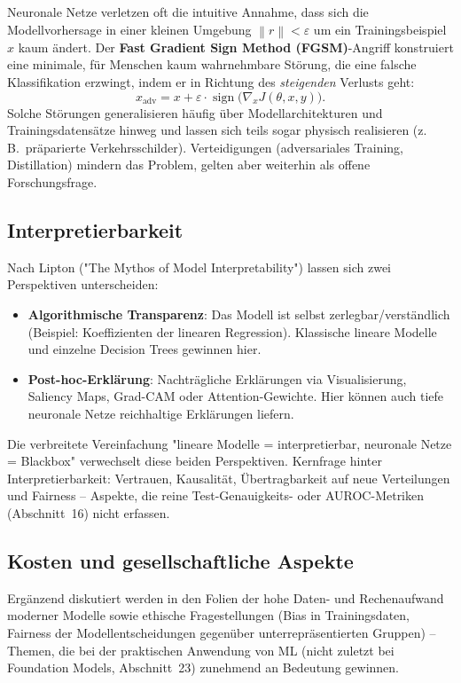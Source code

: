 \documentclass[11pt]{article}
\theoremstyle{csthm}
\theoremstyle{csdef}
\newcommand{\norm}[1]{\left\|#1\right\|}
\begin{document}
Neuronale Netze verletzen oft die intuitive Annahme, dass sich die
Modellvorhersage in einer kleinen Umgebung $\norm{r}<\varepsilon$ um ein
Trainingsbeispiel $x$ kaum ändert. Der \textbf{Fast Gradient Sign Method
(FGSM)}-Angriff konstruiert eine minimale, für Menschen kaum wahrnehmbare
Störung, die eine falsche Klassifikation erzwingt, indem er in Richtung des
\emph{steigenden} Verlusts geht:
\begin{equation}
  x_\text{adv} = x + \varepsilon\cdot\operatorname{sign}\bigl(\nabla_x J(\theta,x,y)\bigr).
\end{equation}
Solche Störungen generalisieren häufig über Modellarchitekturen und
Trainingsdatensätze hinweg und lassen sich teils sogar physisch realisieren
(z.\,B.\ präparierte Verkehrsschilder). Verteidigungen (adversariales
Training, Distillation) mindern das Problem, gelten aber weiterhin als
offene Forschungsfrage.

\subsection{Interpretierbarkeit}

Nach Lipton ("The Mythos of Model Interpretability") lassen sich zwei
Perspektiven unterscheiden:
\begin{itemize}
  \item \textbf{Algorithmische Transparenz}: Das Modell ist selbst
        zerlegbar/verständlich (Beispiel: Koeffizienten der linearen
        Regression). Klassische lineare Modelle und einzelne Decision Trees
        gewinnen hier.
  \item \textbf{Post-hoc-Erklärung}: Nachträgliche Erklärungen via
        Visualisierung, Saliency Maps, Grad-CAM oder Attention-Gewichte.
        Hier können auch tiefe neuronale Netze reichhaltige Erklärungen
        liefern.
\end{itemize}
Die verbreitete Vereinfachung "lineare Modelle = interpretierbar, neuronale
Netze = Blackbox" verwechselt diese beiden Perspektiven. Kernfrage hinter
Interpretierbarkeit: Vertrauen, Kausalität, Übertragbarkeit auf neue
Verteilungen und Fairness -- Aspekte, die reine Test-Genauigkeits- oder
AUROC-Metriken (Abschnitt~16) nicht erfassen.

\subsection{Kosten und gesellschaftliche Aspekte}

Ergänzend diskutiert werden in den Folien der hohe Daten- und
Rechenaufwand moderner Modelle sowie ethische Fragestellungen (Bias in
Trainingsdaten, Fairness der Modellentscheidungen gegenüber
unterrepräsentierten Gruppen) -- Themen, die bei der praktischen
Anwendung von ML (nicht zuletzt bei Foundation Models, Abschnitt~23)
zunehmend an Bedeutung gewinnen.
\end{document}
